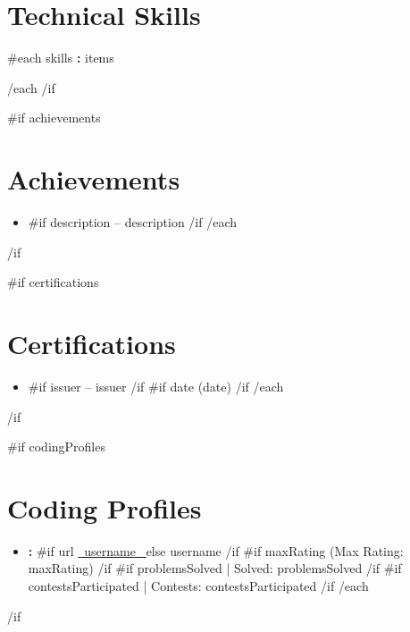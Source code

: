 \documentclass[10pt,a4paper]{article}
\begin{document}
\section{Technical Skills}

{{#each skills}}
\textbf{:}
{{items}}
\par
\vspace{1pt}
{{/each}}
{{/if}}

{{#if achievements}}
\section{Achievements}

\begin{itemize}
    {{#each achievements}}
    \item \textbf{ }
    {{#if description}}
    -- {{description}}
    {{/if}}
    {{/each}}
\end{itemize}
{{/if}}

{{#if certifications}}
\section{Certifications}

\begin{itemize}
    {{#each certifications}}
    \item \textbf{ }
    {{#if issuer}}
    -- {{issuer}}
    {{/if}}
    {{#if date}}
    {\small\color{muted} ({{date}})}
    {{/if}}
    {{/each}}
\end{itemize}
{{/if}}

{{#if codingProfiles}}
\section{Coding Profiles}

\begin{itemize}
    {{#each codingProfiles}}
    \item
    \textbf{:}
    {{#if url}}
    \href{ {{~url~}} }{ {{~username~}} }
    {{else}}
    {{username}}
    {{/if}}
    {{#if maxRating}}
    \enspace (Max Rating: {{maxRating}})
    {{/if}}
    {{#if problemsSolved}}
    \enspace | \enspace Solved: {{problemsSolved}}
    {{/if}}
    {{#if contestsParticipated}}
    \enspace | \enspace Contests: {{contestsParticipated}}
    {{/if}}
    {{/each}}
\end{itemize}
{{/if}}
\end{document}
